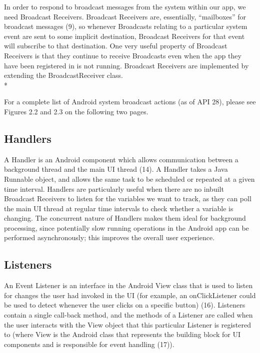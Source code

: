 \documentclass[12pt,twoside]{report}
\begin{document}
In order to respond to broadcast messages from the system within our app, we need Broadcast Receivers. Broadcast Receivers are, essentially, “mailboxes” for broadcast messages (9), so whenever Broadcasts relating to a particular system event are sent to some implicit destination, Broadcast Receivers for that event will subscribe to that destination. One very useful property of Broadcast Receivers is that they continue to receive Broadcasts even when the app they have been registered in is not running. Broadcast Receivers are implemented by extending the BroadcastReceiver class. \\*

For a complete list of Android system broadcast actions (as of API 28), please see Figures 2.2 and 2.3 on the following two pages.

\subsection{Handlers}

A Handler is an Android component which allows communication between a background thread and the main UI thread (14). A Handler takes a Java Runnable object, and allows the same task to be scheduled or repeated at a given time interval. Handlers are particularly useful when there are no inbuilt Broadcast Receivers to listen for the variables we want to track, as they can poll the main UI thread at regular time intervals to check whether a variable is changing. The concurrent nature of Handlers makes them ideal for background processing, since potentially slow running operations in the Android app can be performed asynchronously; this improves the overall user experience.

\subsection{Listeners}
An Event Listener is an interface in the Android View class that is used to listen for changes the user had invoked in the UI (for example, an onClickListener could be used to detect whenever the user clicks on a specific button) (16). Listeners contain a single call-back method, and the methods of a Listener are called when the user interacts with the View object that this particular Listener is registered to (where View is the Android class that represents the building block for UI components and is responsible for event handling (17)).
\end{document}
